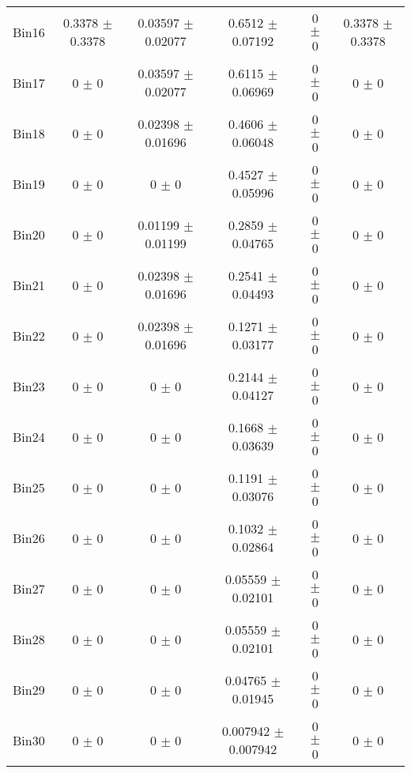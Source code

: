 \begin{tabular}{@{\extracolsep{4pt}}lccccc@{}}
     Bin16 & 0.3378 $\pm$ 0.3378 & 0.03597 $\pm$ 0.02077 & 0.6512 $\pm$ 0.07192 & 0 $\pm$ 0 & 0.3378 $\pm$ 0.3378 \\ 
     Bin17 & 0 $\pm$ 0 & 0.03597 $\pm$ 0.02077 & 0.6115 $\pm$ 0.06969 & 0 $\pm$ 0 & 0 $\pm$ 0 \\ 
     Bin18 & 0 $\pm$ 0 & 0.02398 $\pm$ 0.01696 & 0.4606 $\pm$ 0.06048 & 0 $\pm$ 0 & 0 $\pm$ 0 \\ 
     Bin19 & 0 $\pm$ 0 & 0 $\pm$ 0 & 0.4527 $\pm$ 0.05996 & 0 $\pm$ 0 & 0 $\pm$ 0 \\ 
     Bin20 & 0 $\pm$ 0 & 0.01199 $\pm$ 0.01199 & 0.2859 $\pm$ 0.04765 & 0 $\pm$ 0 & 0 $\pm$ 0 \\ 
     Bin21 & 0 $\pm$ 0 & 0.02398 $\pm$ 0.01696 & 0.2541 $\pm$ 0.04493 & 0 $\pm$ 0 & 0 $\pm$ 0 \\ 
     Bin22 & 0 $\pm$ 0 & 0.02398 $\pm$ 0.01696 & 0.1271 $\pm$ 0.03177 & 0 $\pm$ 0 & 0 $\pm$ 0 \\ 
     Bin23 & 0 $\pm$ 0 & 0 $\pm$ 0 & 0.2144 $\pm$ 0.04127 & 0 $\pm$ 0 & 0 $\pm$ 0 \\ 
     Bin24 & 0 $\pm$ 0 & 0 $\pm$ 0 & 0.1668 $\pm$ 0.03639 & 0 $\pm$ 0 & 0 $\pm$ 0 \\ 
     Bin25 & 0 $\pm$ 0 & 0 $\pm$ 0 & 0.1191 $\pm$ 0.03076 & 0 $\pm$ 0 & 0 $\pm$ 0 \\ 
     Bin26 & 0 $\pm$ 0 & 0 $\pm$ 0 & 0.1032 $\pm$ 0.02864 & 0 $\pm$ 0 & 0 $\pm$ 0 \\ 
     Bin27 & 0 $\pm$ 0 & 0 $\pm$ 0 & 0.05559 $\pm$ 0.02101 & 0 $\pm$ 0 & 0 $\pm$ 0 \\ 
     Bin28 & 0 $\pm$ 0 & 0 $\pm$ 0 & 0.05559 $\pm$ 0.02101 & 0 $\pm$ 0 & 0 $\pm$ 0 \\ 
     Bin29 & 0 $\pm$ 0 & 0 $\pm$ 0 & 0.04765 $\pm$ 0.01945 & 0 $\pm$ 0 & 0 $\pm$ 0 \\ 
     Bin30 & 0 $\pm$ 0 & 0 $\pm$ 0 & 0.007942 $\pm$ 0.007942 & 0 $\pm$ 0 & 0 $\pm$ 0 \\ 
\hline\hline
  \end{tabular}
